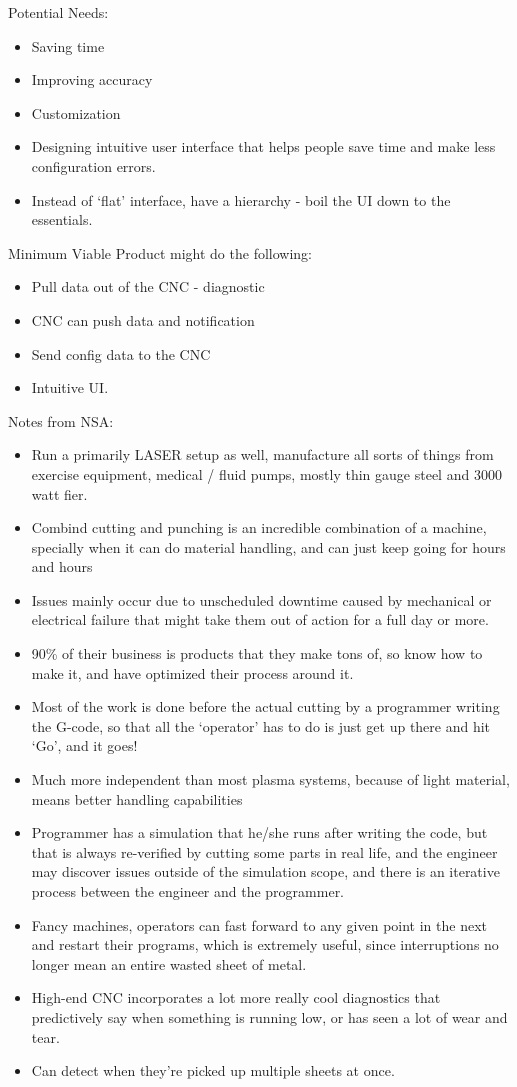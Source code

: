 \documentclass[12pt,letterpaper,titlepage]{article}
\newlength{\wideitemsep}
\let\olditem\item
\renewcommand{\item}{\setlength{\itemsep}{\wideitemsep}\olditem}
\begin{document}
Potential Needs:

\begin{itemize}
\item Saving time
\item Improving accuracy
\item Customization
\item Designing intuitive user interface that helps people save time and make less configuration errors.
\item Instead of ‘flat’ interface, have a hierarchy - boil the UI down to the essentials.
\end{itemize}

Minimum Viable Product might do the following:
\begin{itemize}
\item Pull data out of the CNC - diagnostic
\item CNC can push data and notification
\item Send config data to the CNC
\item Intuitive UI.
\end{itemize}

Notes from NSA:

\begin{itemize}
\item Run a primarily LASER setup as well, manufacture all sorts of things from exercise equipment, medical / fluid pumps, mostly thin gauge steel and 3000 watt fier.
\item Combind cutting and punching is an incredible combination of a machine, specially when it can do material handling, and can just keep going for hours and hours
\item Issues mainly occur due to unscheduled downtime caused by mechanical or electrical failure that might take them out of action for a full day or more.
\item 90\% of their business is products that they make tons of, so know how to make it, and have optimized their process around it.
\item Most of the work is done before the actual cutting by a programmer writing the G-code, so that all the ‘operator’ has to do is just get up there and hit ‘Go’, and it goes!
\item Much more independent than most plasma systems, because of light material, means better handling capabilities
\item Programmer has a simulation that he/she runs after writing the code, but that is always re-verified by cutting some parts in real life, and the engineer may discover issues outside of the simulation scope, and there is an iterative process between the engineer and the programmer.
\item Fancy machines, operators can fast forward to any given point in the next and restart their programs, which is extremely useful, since interruptions no longer mean an entire wasted sheet of metal.
\item High-end CNC incorporates a lot more really cool diagnostics that predictively say when something is running low, or has seen a lot of wear and tear.
\item Can detect when they’re picked up multiple sheets at once.
\end{itemize}
\end{document}
